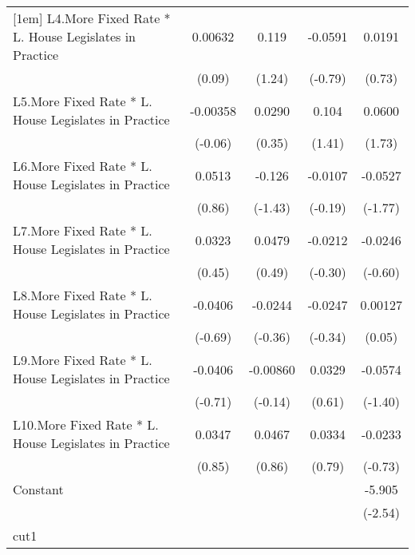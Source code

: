 {\begin{longtable}{l*{4}{c}}
[1em]
L4.More Fixed Rate * L. House Legislates in Practice&  0.00632         &    0.119         &  -0.0591         &   0.0191         \\
                &   (0.09)         &   (1.24)         &  (-0.79)         &   (0.73)         \\
[1em]
L5.More Fixed Rate * L. House Legislates in Practice& -0.00358         &   0.0290         &    0.104         &   0.0600         \\
                &  (-0.06)         &   (0.35)         &   (1.41)         &   (1.73)         \\
[1em]
L6.More Fixed Rate * L. House Legislates in Practice&   0.0513         &   -0.126         &  -0.0107         &  -0.0527         \\
                &   (0.86)         &  (-1.43)         &  (-0.19)         &  (-1.77)         \\
[1em]
L7.More Fixed Rate * L. House Legislates in Practice&   0.0323         &   0.0479         &  -0.0212         &  -0.0246         \\
                &   (0.45)         &   (0.49)         &  (-0.30)         &  (-0.60)         \\
[1em]
L8.More Fixed Rate * L. House Legislates in Practice&  -0.0406         &  -0.0244         &  -0.0247         &  0.00127         \\
                &  (-0.69)         &  (-0.36)         &  (-0.34)         &   (0.05)         \\
[1em]
L9.More Fixed Rate * L. House Legislates in Practice&  -0.0406         & -0.00860         &   0.0329         &  -0.0574         \\
                &  (-0.71)         &  (-0.14)         &   (0.61)         &  (-1.40)         \\
[1em]
L10.More Fixed Rate * L. House Legislates in Practice&   0.0347         &   0.0467         &   0.0334         &  -0.0233         \\
                &   (0.85)         &   (0.86)         &   (0.79)         &  (-0.73)         \\
[1em]
Constant        &                  &                  &                  &   -5.905\sym{*}  \\
                &                  &                  &                  &  (-2.54)         \\
\hline
cut1            &                  &                  &                  &                  \\

\end{longtable}}
